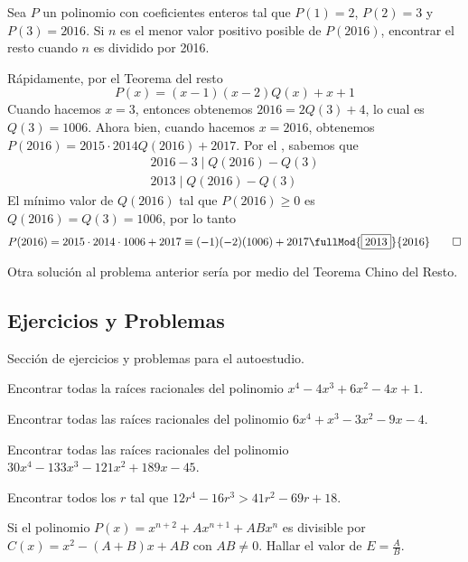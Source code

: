 \begin{section-example.tcb}
    Sea $P$ un polinomio con coeficientes enteros tal que $P(1) = 2$, $P(2) = 3$ y $P(3) = 2016$.
    Si $n$ es el menor valor positivo posible de $P(2016)$, encontrar el resto cuando $n$ es dividido por 2016.
\end{section-example.tcb}
\begin{solution}
    Rápidamente, por el Teorema del resto
    \[
        P(x) = (x - 1)(x - 2)Q(x) + x + 1
    \]
    Cuando hacemos $x = 3$, entonces obtenemos $2016 = 2Q(3) + 4$, lo cual es $Q(3) = 1006$.
    Ahora bien, cuando hacemos $x = 2016$, obtenemos $P(2016) = 2015\cdot2014Q(2016) + 2017$.
    Por el , sabemos que
    \begin{gather*}
        2016 - 3 \mid Q(2016) - Q(3)\\
        2013 \mid Q(2016) - Q(3)
    \end{gather*}
    El mínimo valor de $Q(2016)$ tal que $P(2016) \geq 0$ es $Q(2016) = Q(3) = 1006$, por lo tanto
    \begin{gather*}
        P(2016) = 2015\cdot2014\cdot1006 + 2017 \equiv (-1)(-2)(1006) + 2017 \fullMod{\boxed{2013}}{2016} \qedhere
    \end{gather*}
\end{solution}

\vspace{-2mm}
Otra solución al problema anterior sería por medio del Teorema Chino del Resto.



\subsection{Ejercicios y Problemas}
Sección de ejercicios y problemas para el autoestudio.

\begin{section-problem}
    Encontrar todas la raíces racionales del polinomio $x^4 - 4x^3 + 6x^2 - 4x + 1$.
\end{section-problem}

\begin{section-problem}
    Encontrar todas las raíces racionales del polinomio $6x^4 + x^3 - 3x^2 - 9x - 4$.
\end{section-problem}

\begin{section-problem}
    Encontrar todas las raíces racionales del polinomio $30x^4 - 133 x^3 - 121x^2 + 189x - 45$.
\end{section-problem}

\begin{section-problem}
    Encontrar todos los $r$ tal que $12r^4 - 16r^3 > 41r^2 - 69r + 18$.
\end{section-problem}

\begin{section-problem}
    Si el polinomio $P(x) = x^{n + 2} + Ax^{n + 1} + ABx^n$ es divisible por $C(x) = x^2 - (A + B)x + AB$ con $AB \neq 0$.
    Hallar el valor de $E = \frac{A}{B}$.
\end{section-problem}
